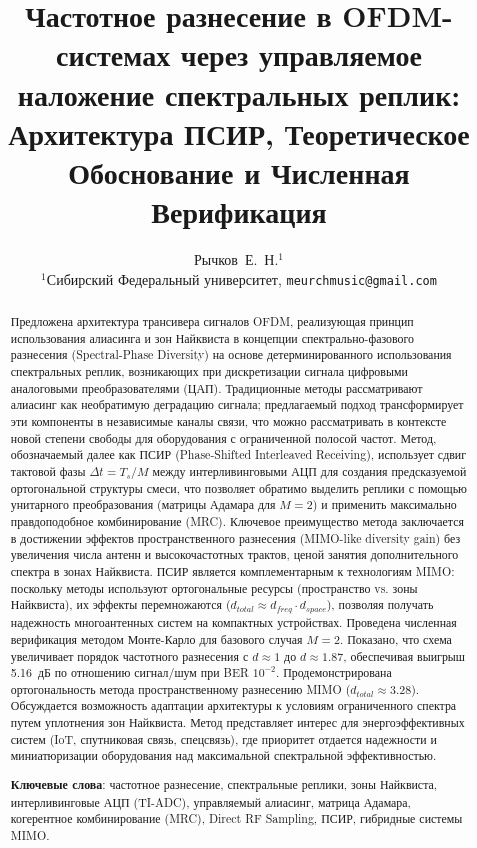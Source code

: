 \documentclass[a4paper,12pt]{article}
\title{\textbf{Частотное разнесение в OFDM-системах через управляемое наложение спектральных реплик:\\ Архитектура ПСИР, Теоретическое Обоснование и Численная Верификация}}
\author{Рычков~Е.~Н.$^{1}$ \\ $^{1}$Сибирский Федеральный университет, \texttt{meurchmusic@gmail.com}}
\date{}
\numberwithin{equation}{section}
\begin{document}
\maketitle

\begin{abstract}
Предложена архитектура трансивера сигналов OFDM, реализующая принцип использования алиасинга и зон Найквиста в концепции
спектрально-фазового разнесения (Spectral-Phase Diversity) на основе детерминированного использования спектральных реплик, возникающих при дискретизации сигнала цифровыми аналоговыми преобразователями (ЦАП). Традиционные методы рассматривают алиасинг как необратимую деградацию сигнала; предлагаемый подход трансформирует эти компоненты в независимые каналы связи, что можно рассматривать в контексте новой степени свободы для оборудования с ограниченной полосой частот. Метод, обозначаемый далее как ПСИР (Phase-Shifted Interleaved Receiving), использует сдвиг тактовой фазы $\Delta t = T_s/M$ между интерливинговыми АЦП для создания предсказуемой ортогональной структуры смеси, что позволяет обратимо выделить реплики с помощью унитарного преобразования (матрицы Адамара для $M=2$) и применить максимально правдоподобное комбинирование (MRC). Ключевое преимущество метода заключается в достижении эффектов пространственного разнесения (MIMO-like diversity gain) без увеличения числа антенн и высокочастотных трактов, ценой занятия дополнительного спектра в зонах Найквиста. ПСИР является комплементарным к технологиям MIMO: поскольку методы используют ортогональные ресурсы (пространство vs. зоны Найквиста), их эффекты перемножаются ($d_{total} \approx d_{freq} \cdot d_{space}$), позволяя получать надежность многоантенных систем на компактных устройствах. Проведена численная верификация методом Монте-Карло для базового случая $M=2$. Показано, что схема увеличивает порядок частотного разнесения с $d \approx 1$ до $d \approx 1.87$, обеспечивая выигрыш 5.16~дБ по отношению сигнал/шум при BER $10^{-2}$. Продемонстрирована ортогональность метода пространственному разнесению MIMO ($d_{total} \approx 3.28$). Обсуждается возможность адаптации архитектуры к условиям ограниченного спектра путем уплотнения зон Найквиста. Метод представляет интерес для энергоэффективных систем (IoT, спутниковая связь, спецсвязь), где приоритет отдается надежности и миниатюризации оборудования над максимальной спектральной эффективностью.

\vspace{0.3cm}
\noindent\textbf{Ключевые слова}: частотное разнесение, спектральные реплики, зоны Найквиста, интерливинговые АЦП (TI-ADC), управляемый алиасинг, матрица Адамара, когерентное комбинирование (MRC), Direct RF Sampling, ПСИР, гибридные системы MIMO.
\end{abstract}
\end{document}
